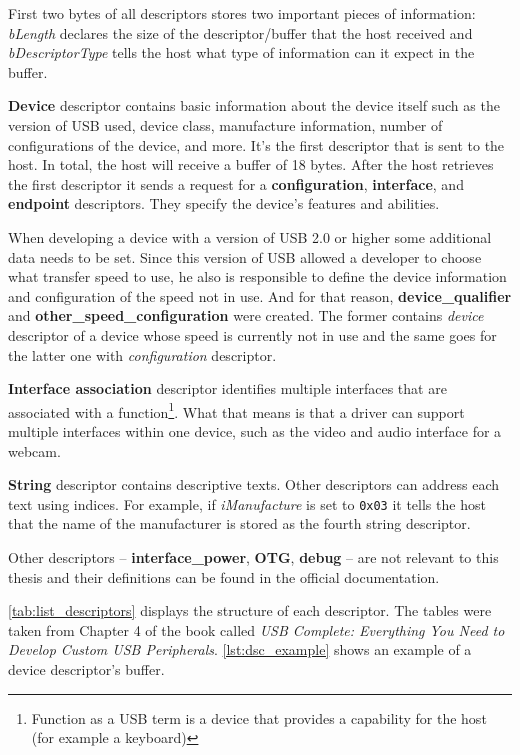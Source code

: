 First two bytes of all descriptors stores two important pieces of information: \emph{bLength} declares the size of the descriptor/buffer that the host received and \emph{bDescriptorType} tells the host what type of information can it expect in the buffer.

\textbf{Device} descriptor contains basic information about the device itself such as the version of USB used, device class, manufacture information, number of configurations of the device, and more. It's the first descriptor that is sent to the host. In total, the host will receive a buffer of 18 bytes. After the host retrieves the first descriptor it sends a request for a \textbf{configuration}, \textbf{interface}, and \textbf{endpoint} descriptors. They specify the device's features and abilities. 

When developing a device with a version of USB 2.0 or higher some additional data needs to be set. Since this version of USB allowed a developer to choose what transfer speed to use, he also is responsible to define the device information and configuration of the speed not in use. And for that reason, \textbf{device\_qualifier} and \textbf{other\_speed\_configuration} were created. The former contains \emph{device} descriptor of a device whose speed is currently not in use and the same goes for the latter one with \emph{configuration} descriptor. 

\textbf{Interface association} descriptor identifies multiple interfaces that are associated with a function\footnote{Function as a USB term is a device that provides a capability for the host (for example a keyboard)}. What that means is that a driver can support multiple interfaces within one device, such as the video and audio interface for a webcam. 

\textbf{String} descriptor contains descriptive texts. Other descriptors can address each text using indices. For example, if \emph{iManufacture} is set to \verb|0x03| it tells the host that the name of the manufacturer is stored as the fourth string descriptor. 

Other descriptors \--- \textbf{interface\_power}, \textbf{OTG}, \textbf{debug} \--- are not relevant to this thesis and their definitions can be found in the official documentation.

\autoref{tab:list_descriptors} displays the structure of each descriptor. The tables were taken from Chapter 4 of the book called \emph{USB Complete: Everything You Need to Develop Custom USB Peripherals}. \autoref{lst:dsc_example} shows an example of a device descriptor's buffer.

